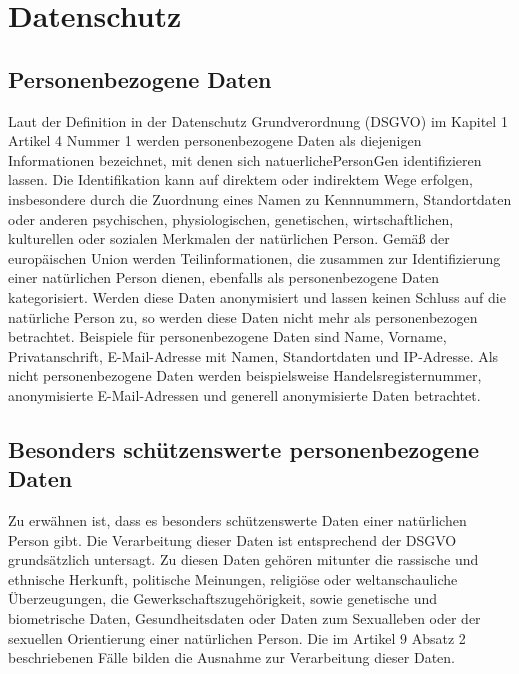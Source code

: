 \section{Datenschutz}
\subsection{Personenbezogene Daten}
Laut der Definition in der Datenschutz Grundverordnung (\gls{DSGVO}) im Kapitel 1 Artikel 4 Nummer 1 werden personenbezogene Daten als diejenigen Informationen bezeichnet, mit denen sich \gls{natuerlichePersonG}en identifizieren lassen. Die Identifikation kann auf direktem oder indirektem Wege erfolgen, insbesondere durch die Zuordnung eines Namen zu Kennnummern, Standortdaten oder anderen psychischen, physiologischen, genetischen, wirtschaftlichen, kulturellen oder sozialen Merkmalen der natürlichen Person. \cite{DSGVO_Art4} Gemäß der europäischen Union werden Teilinformationen, die zusammen zur Identifizierung einer natürlichen Person dienen, ebenfalls als personenbezogene Daten kategorisiert. Werden diese Daten anonymisiert und lassen keinen Schluss auf die natürliche Person zu, so werden diese Daten nicht mehr als personenbezogen betrachtet. Beispiele für personenbezogene Daten sind Name, Vorname, Privatanschrift, E-Mail-Adresse mit Namen, Standortdaten und IP-Adresse. Als nicht personenbezogene Daten werden beispielsweise Handelsregisternummer, anonymisierte E-Mail-Adressen und generell anonymisierte Daten betrachtet. \cite{PersBezDaten_2021}

\subsection{Besonders schützenswerte personenbezogene Daten} \label{DSGVO_besonders}
Zu erwähnen ist, dass es besonders schützenswerte Daten einer natürlichen Person gibt. Die Verarbeitung dieser Daten ist entsprechend der DSGVO grundsätzlich untersagt. Zu diesen Daten gehören mitunter die rassische und ethnische Herkunft, politische Meinungen, religiöse oder weltanschauliche Überzeugungen, die Gewerkschaftszugehörigkeit, sowie genetische und biometrische Daten, Gesundheitsdaten oder Daten zum Sexualleben oder der sexuellen Orientierung einer natürlichen Person. Die im Artikel 9 Absatz 2 beschriebenen Fälle bilden die Ausnahme zur Verarbeitung dieser Daten. \cite{DSGVO_Art9}
